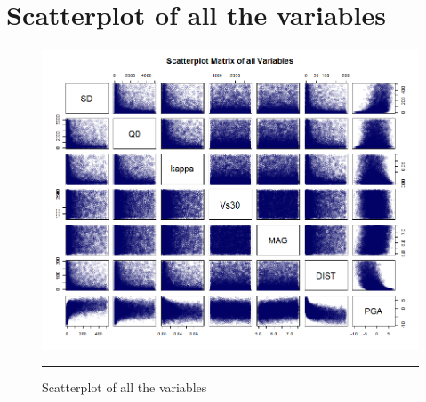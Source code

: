 
\chapter{Scatterplot of all the variables} %

\label{AppendixA} %

\begin{figure}[htbp]%
	\centering
		\includegraphics[scale=0.5]{Figures/allvsall.png}
		\rule{35em}{0.5pt}
	\caption[Scatterplot of all the variables]{Scatterplot of all the variables}
\end{figure}